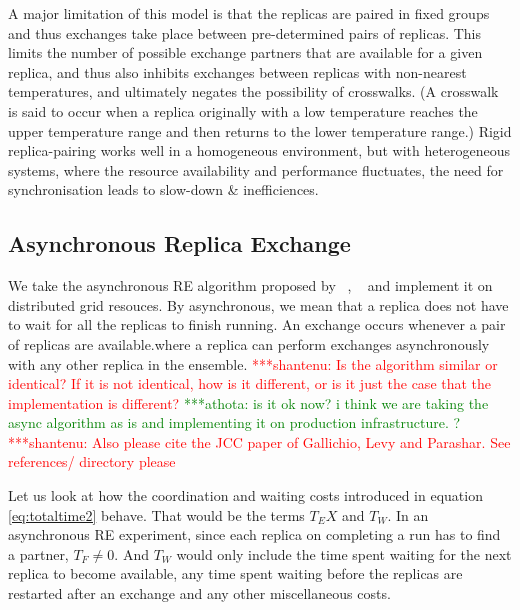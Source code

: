 \documentclass{rspublic}
\newcommand{\jhanote}[1]{ {\textcolor{red} { ***shantenu: #1 }}}
\newcommand{\athotanote}[1]{ {\textcolor{green} { ***athota: #1 }}}
\newcommand{\athotanote}[1]{}
\newcommand{\jhanote}[1]{}
\begin{document}

A major limitation of this model is that the replicas are paired in
fixed groups and thus exchanges take place between pre-determined
pairs of replicas.  This limits the number of possible exchange
partners that are available for a given replica, and thus also
inhibits exchanges between replicas with non-nearest temperatures, and
ultimately negates the possibility of crosswalks. (A crosswalk is said
to occur when a replica originally with a low temperature reaches the
upper temperature range and then returns to the lower temperature
range.)  Rigid replica-pairing works well in a homogeneous
environment, but with heterogeneous systems, where the resource
availability and performance fluctuates, the need for synchronisation
leads to slow-down \& inefficiences.

 
\subsection{Asynchronous Replica Exchange}


We take the asynchronous RE algorithm proposed by ~\citep{parashar_arepex}, ~\citep{??} and implement it on distributed grid resouces. By
asynchronous, we mean that a replica does not have to wait for all the
replicas to finish running. An exchange occurs whenever a pair of replicas are available.where a replica can perform exchanges
asynchronously with any other replica in the ensemble. \jhanote{Is the
  algorithm similar or identical? If it is not identical, how is it
  different, or is it just the case that the implementation is
  different?} \athotanote{is it ok now? i think we are taking the async algorithm as is and implementing it on production infrastructure. ?} \jhanote{Also please cite the JCC paper of Gallichio,
  Levy and Parashar. See references/ directory please} 

Let us look at how the coordination and waiting costs introduced in equation \ref{eq:totaltime2} behave. That would be the terms $T_EX$ and $T_W$. In an asynchronous RE experiment, since each replica on completing a run has to find a partner, $T_F \neq 0$. And $T_W$ would only include the time spent waiting for the next replica to become available, any time spent waiting before the replicas are restarted after an exchange and any other miscellaneous costs.
\end{document}
